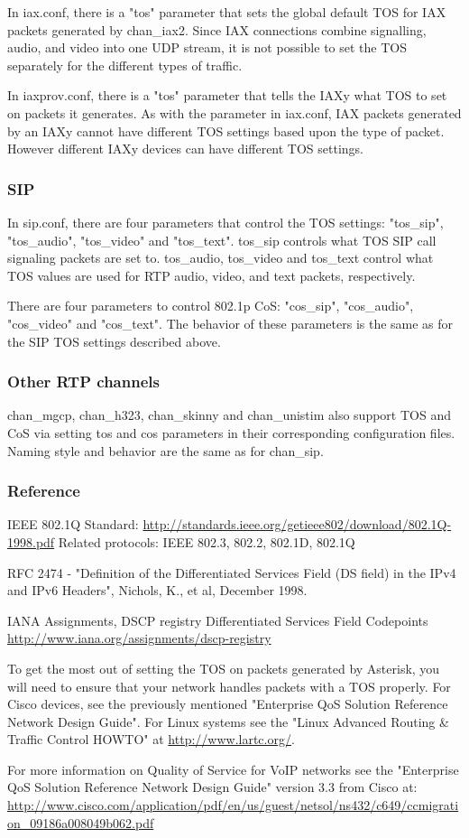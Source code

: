 In iax.conf, there is a "tos" parameter that sets the global default TOS
for IAX packets generated by chan\_iax2.  Since IAX connections combine
signalling, audio, and video into one UDP stream, it is not possible
to set the TOS separately for the different types of traffic.

In iaxprov.conf, there is a "tos" parameter that tells the IAXy what TOS
to set on packets it generates.  As with the parameter in iax.conf,
IAX packets generated by an IAXy cannot have different TOS settings
based upon the type of packet.  However different IAXy devices can
have different TOS settings.

\subsubsection{SIP}

In sip.conf, there are four parameters that control the TOS settings:
"tos\_sip", "tos\_audio", "tos\_video" and "tos\_text". tos\_sip controls
what TOS SIP call signaling packets are set to. tos\_audio, tos\_video
and tos\_text control what TOS values are used for RTP audio, video, and text
packets, respectively.

There are four parameters to control 802.1p CoS: "cos\_sip", "cos\_audio",
"cos\_video" and "cos\_text". The behavior of these parameters is the
same as for the SIP TOS settings described above.

\subsubsection{Other RTP channels}

chan\_mgcp, chan\_h323, chan\_skinny and chan\_unistim also support TOS and
CoS via setting tos and cos parameters in their corresponding configuration
files. Naming style and behavior are the same as for chan\_sip.

\subsubsection{Reference}

IEEE 802.1Q Standard:
\url{http://standards.ieee.org/getieee802/download/802.1Q-1998.pdf}
Related protocols: IEEE 802.3, 802.2, 802.1D, 802.1Q

RFC 2474 - "Definition of the Differentiated Services Field
(DS field) in the IPv4 and IPv6 Headers", Nichols, K., et al,
December 1998.

IANA Assignments, DSCP registry
Differentiated Services Field Codepoints
\url{http://www.iana.org/assignments/dscp-registry}

To get the most out of setting the TOS on packets generated by
Asterisk, you will need to ensure that your network handles packets
with a TOS properly.  For Cisco devices, see the previously mentioned
"Enterprise QoS Solution Reference Network Design Guide".  For Linux
systems see the "Linux Advanced Routing \& Traffic Control HOWTO" at 
\url{http://www.lartc.org/}.

For more information on Quality of
Service for VoIP networks see the "Enterprise QoS Solution Reference
Network Design Guide" version 3.3 from Cisco at:
\url{http://www.cisco.com/application/pdf/en/us/guest/netsol/ns432/c649/ccmigration\_09186a008049b062.pdf}

